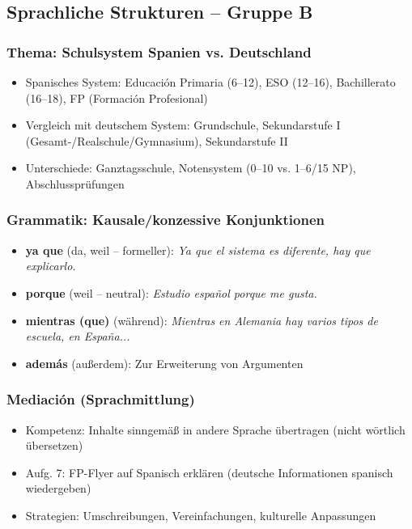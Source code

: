 \documentclass[11pt,a4paper]{article}
\begin{document}
\subsection{Sprachliche Strukturen -- Gruppe B}

\subsubsection{Thema: Schulsystem Spanien vs. Deutschland}
\begin{itemize}
    \item Spanisches System: Educación Primaria (6--12), ESO (12--16), Bachillerato (16--18), FP (Formación Profesional)
    \item Vergleich mit deutschem System: Grundschule, Sekundarstufe I (Gesamt-/Realschule/Gymnasium), Sekundarstufe II
    \item Unterschiede: Ganztagsschule, Notensystem (0--10 vs. 1--6/15 NP), Abschlussprüfungen
\end{itemize}

\subsubsection{Grammatik: Kausale/konzessive Konjunktionen}
\begin{itemize}
    \item \textbf{ya que} (da, weil -- formeller): \textit{Ya que el sistema es diferente, hay que explicarlo.}
    \item \textbf{porque} (weil -- neutral): \textit{Estudio español porque me gusta.}
    \item \textbf{mientras (que)} (während): \textit{Mientras en Alemania hay varios tipos de escuela, en España...}
    \item \textbf{además} (außerdem): Zur Erweiterung von Argumenten
\end{itemize}

\subsubsection{Mediación (Sprachmittlung)}
\begin{itemize}
    \item Kompetenz: Inhalte sinngemäß in andere Sprache übertragen (nicht wörtlich übersetzen)
    \item Aufg. 7: FP-Flyer auf Spanisch erklären (deutsche Informationen spanisch wiedergeben)
    \item Strategien: Umschreibungen, Vereinfachungen, kulturelle Anpassungen
\end{itemize}
\end{document}
